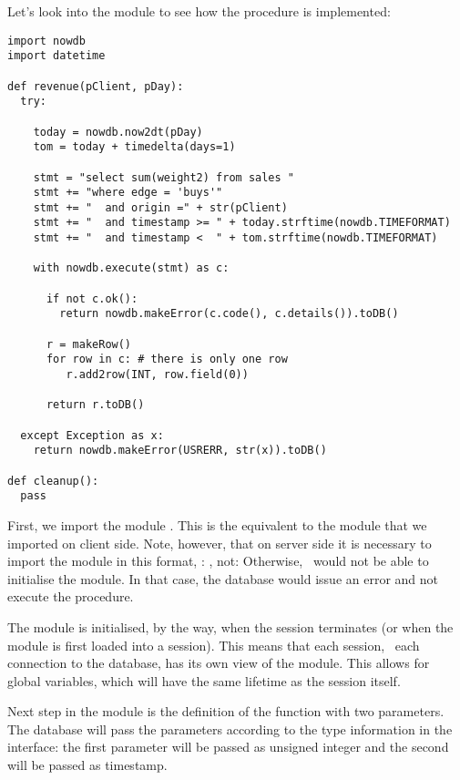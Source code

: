 \begin{minipage}{\textwidth}
Let's look into the module 
to see how the procedure is implemented:

\begin{python}
\begin{lstlisting}
import nowdb
import datetime

def revenue(pClient, pDay):
  try:

    today = nowdb.now2dt(pDay)
    tom = today + timedelta(days=1)

    stmt = "select sum(weight2) from sales "
    stmt += "where edge = 'buys'"
    stmt += "  and origin =" + str(pClient)
    stmt += "  and timestamp >= " + today.strftime(nowdb.TIMEFORMAT)
    stmt += "  and timestamp <  " + tom.strftime(nowdb.TIMEFORMAT)

    with nowdb.execute(stmt) as c:

      if not c.ok():
        return nowdb.makeError(c.code(), c.details()).toDB()

      r = makeRow()
      for row in c: # there is only one row
         r.add2row(INT, row.field(0))

      return r.toDB()

  except Exception as x:
    return nowdb.makeError(USRERR, str(x)).toDB()

def cleanup():
  pass

\end{lstlisting}
\end{python}
\end{minipage}

First, we import the module .
This is the equivalent to the  module
that we imported on client side.
Note, however, that on server side
it is necessary to import the module in this format,
\ie: , not: 
Otherwise, \nowdb\ would not be able to initialise the module.
In that case, the database would issue an error 
and not execute the procedure.

The module is initialised, by the way, when the session
terminates (or when the module is first loaded into a session).
This means
that each session, \ie\ each connection to the database,
has its own view of the module. This allows for
global variables, which will have the same lifetime
as the session itself.

Next step in the module is
the definition of the function  with two parameters.
The database will pass the parameters according to the type
information in the interface: the first parameter
will be passed as unsigned integer and the second
will be passed as timestamp.

